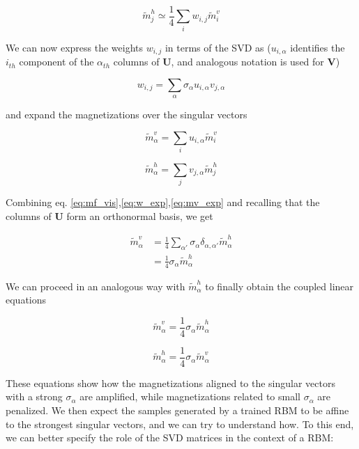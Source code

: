 \documentclass{revtex4-1}
\begin{document}
\begin{equation}
\tilde{m}_j^h \simeq \frac{1}{4} \sum_i w_{i,j} \tilde{m}_i^v
\end{equation}

We can now express the weights \(w_{i,j}\) in terms of the SVD as (\(u_{i,\alpha}\) identifies the \(i_{th}\) component of the \(\alpha_{th}\) columns of \(\mathbf{U}\), and analogous notation is used for \(\mathbf{V}\))

\begin{equation}
w_{i,j} = \sum_{\alpha} \sigma_{\alpha} u_{i,\alpha} v_{j,\alpha}
\label{eq:w_exp}
\end{equation}

and expand the magnetizations over the singular vectors

\begin{equation}
\tilde{m}_{\alpha}^v = \sum_i u_{i,\alpha} \tilde{m}_i^v
\label{eq:mv_exp}
\end{equation}

\begin{equation}
\tilde{m}_{\alpha}^h = \sum_j v_{j,\alpha} \tilde{m}_j^h
\end{equation}

Combining eq. \eqref{eq:mf_vis},\eqref{eq:w_exp},\eqref{eq:mv_exp} and recalling that the columns of \(\mathbf{U}\) form an orthonormal basis, we get

\begin{align*}
\tilde{m}_{\alpha}^v & = \frac{1}{4} \sum_{\alpha '} \sigma_{\alpha} \delta_{\alpha,\alpha '} \tilde{m}_{\alpha}^h \\ \nonumber
& = \frac{1}{4} \sigma_{\alpha} \tilde{m}_{\alpha}^h \nonumber
\end{align*}

We can proceed in an analogous way with \(\tilde{m}_{\alpha}^h\) to finally obtain the coupled linear equations

\begin{equation}
\tilde{m}_{\alpha}^v = \frac{1}{4} \sigma_{\alpha} \tilde{m}_{\alpha}^h
\end{equation}

\begin{equation}
\tilde{m}_{\alpha}^h = \frac{1}{4} \sigma_{\alpha} \tilde{m}_{\alpha}^v
\end{equation}

These equations show how the magnetizations aligned to the singular vectors with a strong \(\sigma_{\alpha}\) are amplified, while magnetizations related to small \(\sigma_{\alpha}\) are penalized. We then expect the samples generated by a trained RBM to be affine to the strongest singular vectors, and we can try to understand how. To this end, we can better specify the role of the SVD matrices in the context of a RBM:
\end{document}
